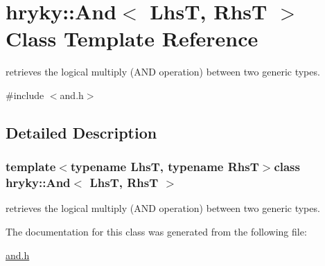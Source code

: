 \hypertarget{classhryky_1_1_and}{\section{hryky\-:\-:And$<$ Lhs\-T, Rhs\-T $>$ Class Template Reference}
\label{classhryky_1_1_and}
}


retrieves the logical multiply (A\-N\-D operation) between two generic types.  




{\ttfamily \#include $<$and.\-h$>$}



\subsection{Detailed Description}
\subsubsection*{template$<$typename Lhs\-T, typename Rhs\-T$>$class hryky\-::\-And$<$ Lhs\-T, Rhs\-T $>$}

retrieves the logical multiply (A\-N\-D operation) between two generic types. 

The documentation for this class was generated from the following file\-:\begin{DoxyCompactItemize}
\item 
\hyperlink{and_8h}{and.\-h}\end{DoxyCompactItemize}
